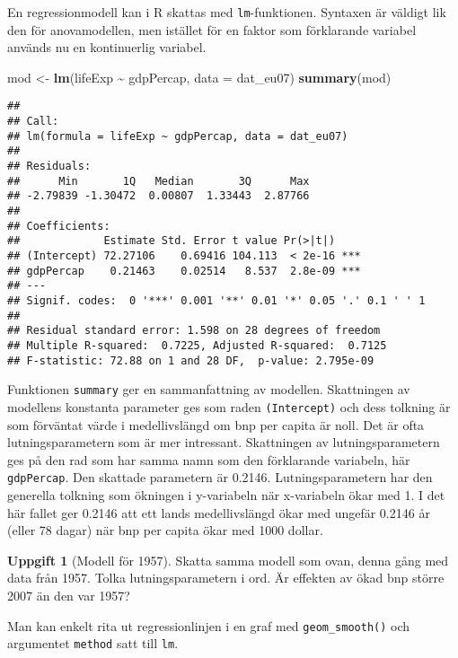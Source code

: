 \documentclass[
]{book}
\newenvironment{Shaded}{\begin{snugshade}}{\end{snugshade}}
\newcommand{\AttributeTok}[1]{\textcolor[rgb]{0.13,0.29,0.53}{#1}}
\newcommand{\FunctionTok}[1]{\textcolor[rgb]{0.13,0.29,0.53}{\textbf{#1}}}
\newcommand{\NormalTok}[1]{#1}
\newcommand{\OtherTok}[1]{\textcolor[rgb]{0.56,0.35,0.01}{#1}}
\newcommand{\SpecialCharTok}[1]{\textcolor[rgb]{0.81,0.36,0.00}{\textbf{#1}}}
\theoremstyle{definition}
\theoremstyle{definition}
\theoremstyle{definition}
\newtheorem{exercise}{Uppgift}[chapter]
\theoremstyle{definition}
\theoremstyle{remark}
\begin{document}
En regressionmodell kan i R skattas med \texttt{lm}-funktionen. Syntaxen är väldigt lik den för anovamodellen, men istället för en faktor som förklarande variabel används nu en kontinuerlig variabel.

\begin{Shaded}
\begin{Highlighting}[]
\NormalTok{mod }\OtherTok{\textless{}{-}} \FunctionTok{lm}\NormalTok{(lifeExp }\SpecialCharTok{\textasciitilde{}}\NormalTok{ gdpPercap, }\AttributeTok{data =}\NormalTok{ dat\_eu07)}
\FunctionTok{summary}\NormalTok{(mod)}
\end{Highlighting}
\end{Shaded}

\begin{verbatim}
## 
## Call:
## lm(formula = lifeExp ~ gdpPercap, data = dat_eu07)
## 
## Residuals:
##      Min       1Q   Median       3Q      Max 
## -2.79839 -1.30472  0.00807  1.33443  2.87766 
## 
## Coefficients:
##             Estimate Std. Error t value Pr(>|t|)    
## (Intercept) 72.27106    0.69416 104.113  < 2e-16 ***
## gdpPercap    0.21463    0.02514   8.537  2.8e-09 ***
## ---
## Signif. codes:  0 '***' 0.001 '**' 0.01 '*' 0.05 '.' 0.1 ' ' 1
## 
## Residual standard error: 1.598 on 28 degrees of freedom
## Multiple R-squared:  0.7225, Adjusted R-squared:  0.7125 
## F-statistic: 72.88 on 1 and 28 DF,  p-value: 2.795e-09
\end{verbatim}

Funktionen \texttt{summary} ger en sammanfattning av modellen. Skattningen av modellens konstanta parameter ges som raden \texttt{(Intercept)} och dess tolkning är som förväntat värde i medellivslängd om bnp per capita är noll. Det är ofta lutningsparametern som är mer intressant. Skattningen av lutningsparametern ges på den rad som har samma namn som den förklarande variabeln, här \texttt{gdpPercap}. Den skattade parametern är 0.2146. Lutningsparametern har den generella tolkning som ökningen i y-variabeln när x-variabeln ökar med 1. I det här fallet ger 0.2146 att ett lands medellivslängd ökar med ungefär 0.2146 år (eller 78 dagar) när bnp per capita ökar med 1000 dollar.

\begin{exercise}[Modell för 1957]
Skatta samma modell som ovan, denna gång med data från 1957. Tolka lutningsparametern i ord. Är effekten av ökad bnp större 2007 än den var 1957?
\end{exercise}

Man kan enkelt rita ut regressionlinjen i en graf med \texttt{geom\_smooth()} och argumentet \texttt{method} satt till \texttt{lm}.
\end{document}
